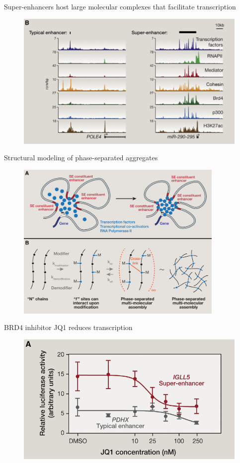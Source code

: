 \documentclass[aspectratio=1610]{beamer}					%
\begin{document}
\begin{frame}{Super-enhancers host large molecular complexes that facilitate transcription}
\begin{figure}
\includegraphics[width=12cm]{figure-5-2.png}
\end{figure}
\end{frame}

\begin{frame}{Structural modeling of phase-separated aggregates}
\begin{figure}
\includegraphics[width=10cm]{figure-5-3.png}
\end{figure}
\end{frame}

\begin{frame}{BRD4 inhibitor JQ1 reduces transcription}
\begin{figure}
\includegraphics[width=12cm]{figure-5-5.png}
\end{figure}
\end{frame}
\end{document}
